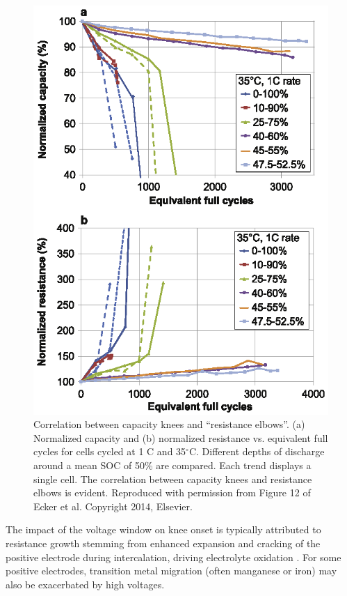 \documentclass[journal=jpclcd,manuscript=article]{achemso}
\begin{document}
\begin{figure}[!ht]
\centering
\includegraphics[scale=1.0]{figures/ecker_capacity_vs_dcr.eps}
\caption{Correlation between capacity knees and ``resistance elbows''.
(a) Normalized capacity and (b) normalized resistance vs. equivalent full cycles for cells cycled at 1 C and 35$^{\circ}$C.
Different depths of discharge around a mean SOC of 50\% are compared. Each trend displays a single cell. The correlation between capacity knees and resistance elbows is evident.
Reproduced with permission from Figure 12 of Ecker et al.\cite{ecker_calendar_2014} Copyright 2014, Elsevier.
}
\label{fig:ecker_capacity_and_resistance}
\end{figure}

The impact of the voltage window on knee onset is typically attributed to resistance growth stemming from enhanced expansion and cracking of the positive electrode during intercalation, driving electrolyte oxidation \cite{ma_editors_2019, aiken_accelerated_2020}. For some positive electrodes, transition metal migration (often manganese or iron) may also be exacerbated by high voltages. \cite{joshi_effects_2014, gilbert_transition_2017, ma_novel_2019}
\end{document}
